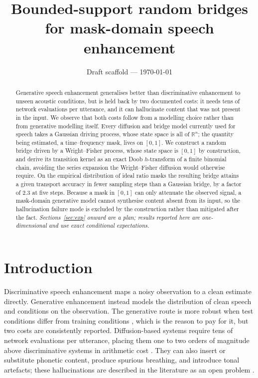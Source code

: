 \documentclass[11pt,a4paper]{article}
\title{Bounded-support random bridges for mask-domain speech enhancement}
\author{}
\date{Draft scaffold --- \today}
\def\R{\mathbb{R}}
\begin{document}
\maketitle

\begin{abstract}
\noindent
Generative speech enhancement generalises better than discriminative
enhancement to unseen acoustic conditions, but is held back by two documented
costs: it needs tens of network evaluations per utterance, and it can
hallucinate content that was not present in the input. We observe that both
costs follow from a modelling choice rather than from generative modelling
itself. Every diffusion and bridge model currently used for speech takes a
Gaussian driving process, whose state space is all of $\R^n$; the quantity being
estimated, a time--frequency mask, lives on $[0,1]$. We construct a random
bridge driven by a Wright--Fisher process, whose state space is $[0,1]$ by
construction, and derive its transition kernel as an exact Doob $h$-transform of
a finite binomial chain, avoiding the series expansion the Wright--Fisher
diffusion would otherwise require. On the empirical distribution of ideal ratio
masks the resulting bridge attains a given transport accuracy in fewer sampling
steps than a Gaussian bridge, by a factor of $2.3$ at five steps. Because a mask
in $[0,1]$ can only attenuate the observed signal, a mask-domain generative
model cannot synthesise content absent from its input, so the hallucination
failure mode is excluded by the construction rather than mitigated after the
fact. \emph{Sections~\ref{sec:exp} onward are a plan; results reported here are
one-dimensional and use exact conditional expectations.}
\end{abstract}

\section{Introduction}

Discriminative speech enhancement maps a noisy observation to a clean estimate
directly. Generative enhancement instead models the distribution of clean
speech and conditions on the observation. The generative route is more robust
when test conditions differ from training conditions
\cite{welker2022,lemercier2023}, which is the reason to pay for it, but two
costs are consistently reported. Diffusion-based systems require tens of network
evaluations per utterance, placing them one to two orders of magnitude above
discriminative systems in arithmetic cost \cite{comparison2026}. They can also
insert or substitute phonetic content, produce spurious breathing, and introduce
tonal artefacts; these hallucinations are described in the literature as an
open problem \cite{comparison2026,artifree2025}.
\end{document}
